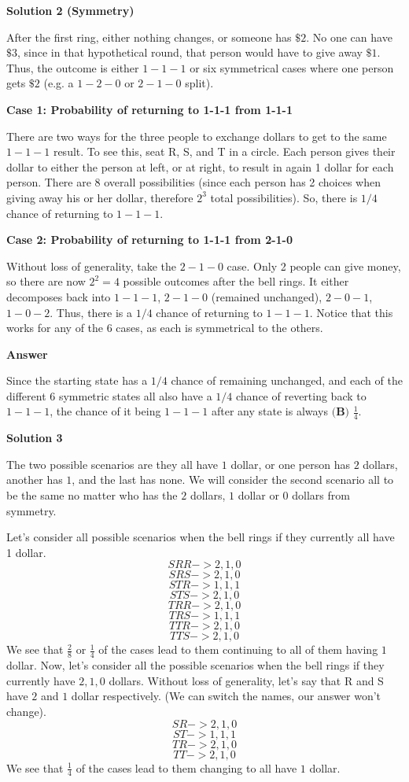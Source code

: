 \begin{enumerate}
 



\textbf{Solution 2 (Symmetry)}

After the first ring, either nothing changes, or someone has $\$2$. No one can have $\$3$, since in that hypothetical round, that person would have to give away $\$1$. Thus, the outcome is either $1-1-1$ or six symmetrical cases where one person gets $\$2$ (e.g. a $1-2-0$ or $2-1-0$ split). 

 
\textbf{Case 1: Probability of returning to 1-1-1 from 1-1-1}

 There are two ways for the three people to exchange dollars to get to the same $1-1-1$ result. To see this, seat R, S, and T in a circle. Each person gives their dollar to either the person at left, or at right, to result in again 1 dollar for each person. There are 8 overall possibilities (since each person has 2 choices when giving away his or her dollar, therefore $2^3$ total possibilities). So, there is $1/4$ chance of returning to $1-1-1$. 

 
\textbf{Case 2: Probability of returning to 1-1-1 from 2-1-0}

 Without loss of generality, take the $2-1-0$ case. Only 2 people can give money, so there are now $2^2=4$ possible outcomes after the bell rings. It either decomposes back into $1-1-1$, $2-1-0$ (remained unchanged), $2-0-1$, $1-0-2$. Thus, there is a $1/4$ chance of returning to $1-1-1$. Notice that this works for any of the 6 cases, as each is symmetrical to the others.

 
\textbf{Answer}

 Since the starting state has a $1/4$ chance of remaining unchanged, and each of the different 6 symmetric states all also have a $1/4$ chance of reverting back to $1-1-1$, the chance of it being $1-1-1$ after any state is always $\boxed{\textbf{(B) } \frac{1}{4}}$.

 



\textbf{Solution 3}

The two possible scenarios are they all have $1$ dollar, or one person has $2$ dollars, another has $1$, and the last has none. We will consider the second scenario all to be the same no matter who has the $2$ dollars, $1$ dollar or $0$ dollars from symmetry.

 Let's consider all possible scenarios when the bell rings if they currently all have 1 dollar.
 \[SRR -> 2, 1, 0\]
 \[SRS -> 2, 1, 0\]
 \[STR -> 1, 1, 1\]
 \[STS -> 2, 1, 0\]
 \[TRR -> 2, 1, 0\]
 \[TRS -> 1, 1, 1\]
 \[TTR -> 2, 1, 0\]
 \[TTS -> 2, 1, 0\]	We see that $\frac{2}{8}$ or $\frac{1}{4}$ of the cases lead to them continuing to all of them having $1$ dollar.	Now, let's consider all the possible scenarios when the bell rings if they currently have $2, 1, 0$ dollars. Without loss of generality, let's say that R and S have $2$ and $1$ dollar respectively. (We can switch the names, our answer won't change).	
 \[SR -> 2, 1, 0\]
 \[ST -> 1, 1, 1\]
 \[TR -> 2, 1, 0\]
 \[TT -> 2, 1, 0\]We see that $\frac{1}{4}$ of the cases lead to them changing to all have $1$ dollar.


\end{enumerate}
